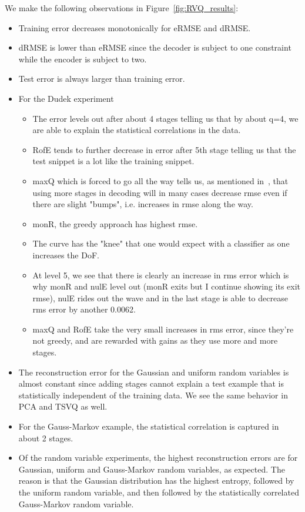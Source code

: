 We make the following observations in Figure~\ref{fig:RVQ_results}:

\begin{itemize}
\item Training error decreases monotonically for eRMSE and dRMSE.
\item dRMSE is lower than eRMSE since the decoder is subject to one constraint while the encoder is subject to two.
\item Test error is always larger than training error.
\item For the Dudek experiment
\begin{itemize}
\item The error levels out after about 4 stages telling us that by about q=4, we are able to explain the statistical correlations in the data.  
\item RofE tends to further decrease in error after 5th stage telling us that the test snippet is a lot like the training snippet.  
\item maxQ which is forced to go all the way tells us, as mentioned in~\cite{1996_JNL_AdvancesRVQ_Barnes}, that using more stages in decoding will in many cases decrease rmse even if there are slight "bumps", i.e. increases in rmse along the way.  
\item monR, the greedy approach has highest rmse.
\item The curve has the "knee" that one would expect with a classifier as one increases the DoF.
\item At level 5, we see that there is clearly an increase in rms error which is why monR and nulE level out (monR exits but I continue showing its exit rmse), nulE rides out the wave and in the last stage is able to decrease rms error by another 0.0062.
\item maxQ and RofE take the very small increases in rms error, since they're not greedy, and are rewarded with gains as they use more and more stages.
\end{itemize}
\item The reconstruction error for the Gaussian and uniform random variables is almost constant since adding stages cannot explain a test example that is statistically independent of the training data.  We see the same behavior in PCA and TSVQ as well.
\item For the Gauss-Markov example, the statistical correlation is captured in about 2 stages.
\item Of the random variable experiments, the highest reconstruction errors are for Gaussian, uniform and Gauss-Markov random variables, as expected.  The reason is that the Gaussian distribution has the highest entropy, followed by the uniform random variable, and then followed by the statistically correlated Gauss-Markov random variable.
\end{itemize}

